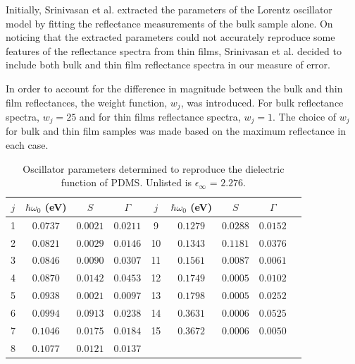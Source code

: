 Initially, Srinivasan et al. extracted the parameters of the Lorentz oscillator model by fitting the reflectance measurements of the bulk sample alone. On noticing that the extracted parameters could not accurately reproduce some features of the reflectance spectra from thin films, Srinivasan et al. decided to include both bulk and thin film reflectance spectra in our measure of error. 

In order to account for the difference in magnitude between the bulk and thin film reflectances, the weight function, $w_j$, was introduced. For bulk reflectance spectra, $w_{j} = 25$ and for thin films reflectance spectra, $w_{j} = 1$. The choice of $w_j$ for bulk and thin film samples was made based on the maximum reflectance in each case.

\begin{table}
	\caption{\label{tab:MinParam} Oscillator parameters determined to reproduce the dielectric function of PDMS. Unlisted is $\epsilon_{\infty}$ = $2.276$.}
	\begin{center}
		\renewcommand{\arraystretch}{1.15}
		\setlength{\tabcolsep}{0.10cm}
		\begin{tabular}{ccccccccc}
			\hline 
			\hline
			\multicolumn{1}{c}{$j$} &
			\multicolumn{1}{c}{$\hbar \omega_{0}$ (eV)} &  \multicolumn{1}{c}{$S$} &
			\multicolumn{1}{c}{$\Gamma$} &
			\multicolumn{1}{c}{$j$} &
			\multicolumn{1}{c}{$\hbar \omega_{0}$ (eV)} &  \multicolumn{1}{c}{$S$} &
			\multicolumn{1}{c}{$\Gamma$} \\ 	
			\hline 
			1 & $0.0737$ & $0.0021$ & $0.0211$ &   9 & $0.1279$ & $0.0288$ & $0.0152$ \\
			2 & $0.0821$ & $0.0029$ & $0.0146$ & 10 & $0.1343$ & $0.1181$ & $0.0376$ \\
			3 & $0.0846$ & $0.0090$ & $0.0307$ & 11 & $0.1561$ & $0.0087$ & $0.0061$ \\ 
			4 & $0.0870$ & $0.0142$ & $0.0453$ & 12 & $0.1749$ & $0.0005$ & $0.0102$ \\
			5 & $0.0938$ & $0.0021$ & $0.0097$ & 13 & $0.1798$ & $0.0005$ & $0.0252$ \\
			6 & $0.0994$ & $0.0913$ & $0.0238$ & 14 & $0.3631$ & $0.0006$ & $0.0525$ \\
			7 & $0.1046$ & $0.0175$ & $0.0184$ & 15 & $0.3672$ & $0.0006$ & $0.0050$ \\
			8 & $0.1077$ & $0.0121$ & $0.0137$ &  &  &  & \\
			\hline
			\hline
		\end{tabular} 
	\end{center}
\end{table}

